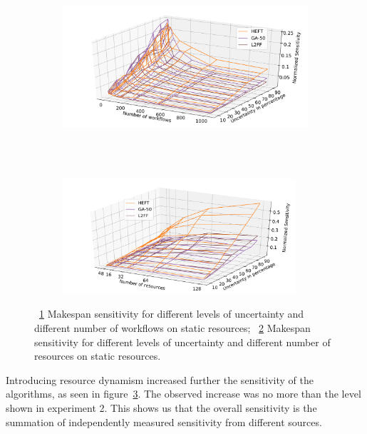 \begin{figure}[ht!]
    \centering
    \begin{subfigure}[b]{0.95\textwidth}
        \includegraphics[width=.95\textwidth]{figures/campaign/InaccurStHeteroCampaigns_4DynHeteroResourcesSens.pdf}
        \caption{}
        \label{fig:InaccurStHeteroCampaigns_4DynHeteroResourcesSens}
    \end{subfigure}\\
    ~ 
    \begin{subfigure}[b]{0.95\textwidth}
        \includegraphics[width=0.95\textwidth]{figures/campaign/InaccurStHeteroResources_StHeteroCampaignsSens.pdf}
        \caption{}
        \label{fig:InaccurDynHeteroResources_StHeteroCampaignsSens}
    \end{subfigure}
    \caption{~\ref{fig:InaccurStHeteroCampaigns_4DynHeteroResourcesSens} Makespan sensitivity for different levels of uncertainty and different number of workflows on static resources;
    ~\ref{fig:InaccurDynHeteroResources_StHeteroCampaignsSens} Makespan sensitivity for different levels of uncertainty and different number of resources on static resources.}
    \label{fig:inaccur_dyn}
\end{figure}

Introducing resource dynamism increased further the sensitivity of the algorithms, as seen in figure~\ref{fig:inaccur_dyn}.
The observed increase was no more than the level shown in experiment 2.
This shows us that the overall sensitivity is the summation of independently measured sensitivity from different sources.

